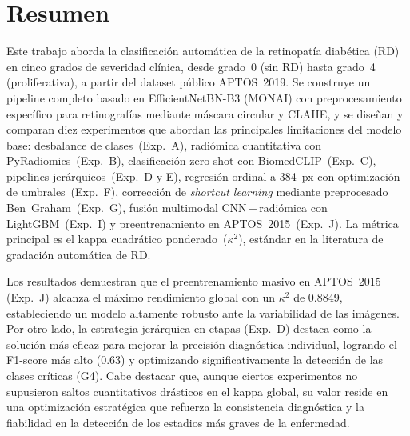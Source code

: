 \documentclass[12pt, a4paper]{article}
\begin{document}
\newpage
{}

\section*{Resumen}

Este trabajo aborda la clasificación automática de la retinopatía diabética (RD) en
cinco grados de severidad clínica, desde grado~0 (sin RD) hasta grado~4
(proliferativa), a partir del dataset público APTOS~2019. Se construye un pipeline
completo basado en EfficientNetBN-B3 (MONAI) con preprocesamiento específico para
retinografías mediante máscara circular y CLAHE, y se diseñan y comparan diez
experimentos que abordan las principales limitaciones del modelo base: desbalance de
clases~(Exp.~A), radiómica cuantitativa con PyRadiomics~(Exp.~B), clasificación
zero-shot con BiomedCLIP~(Exp.~C), pipelines jerárquicos~(Exp.~D y E), regresión
ordinal a 384~px con optimización de umbrales~(Exp.~F), corrección de
\textit{shortcut learning} mediante preprocesado Ben~Graham~(Exp.~G), fusión
multimodal CNN\,+\,radiómica con LightGBM~(Exp.~I) y preentrenamiento en
APTOS~2015~(Exp.~J). La métrica principal es el kappa cuadrático ponderado~($\kappa^2$),
estándar en la literatura de gradación automática de RD. 

Los resultados demuestran que el preentrenamiento masivo en APTOS~2015 (Exp.~J) alcanza 
el máximo rendimiento global con un $\kappa^2$ de 0.8849, estableciendo un modelo 
altamente robusto ante la variabilidad de las imágenes. Por otro lado, la estrategia 
jerárquica en etapas (Exp.~D) destaca como la solución más eficaz para mejorar la 
precisión diagnóstica individual, logrando el F1-score más alto (0.63) y optimizando 
significativamente la detección de las clases críticas (G4). Cabe destacar que, aunque 
ciertos experimentos no supusieron saltos cuantitativos drásticos en el kappa global, 
su valor reside en una optimización estratégica que refuerza la consistencia diagnóstica 
y la fiabilidad en la detección de los estadios más graves de la enfermedad.

\newpage
{}
\tableofcontents
\end{document}

